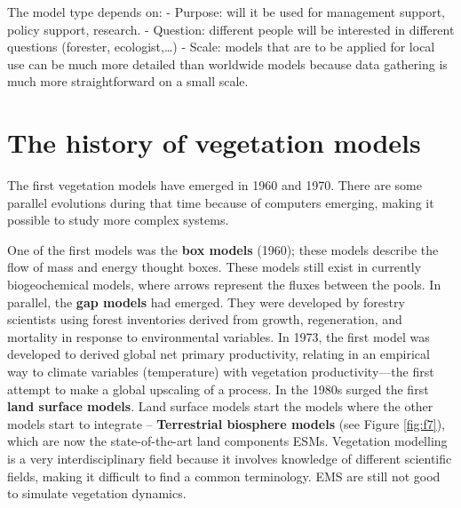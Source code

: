 \documentclass[12pt,oneside]{book}
\begin{document}
The model type depends on: - Purpose: will it be used for management
support, policy support, research. - Question: different people will be
interested in different questions (forester, ecologist,\ldots{}) -
Scale: models that are to be applied for local use can be much more
detailed than worldwide models because data gathering is much more
straightforward on a small scale.

\section{The history of vegetation
models}\label{the-history-of-vegetation-models}

The first vegetation models have emerged in 1960 and 1970. There are
some parallel evolutions during that time because of computers emerging,
making it possible to study more complex systems.

One of the first models was the \textbf{box models} (1960); these models
describe the flow of mass and energy thought boxes. These models still
exist in currently biogeochemical models, where arrows represent the
fluxes between the pools. In parallel, the \textbf{gap models} had
emerged. They were developed by forestry scientists using forest
inventories derived from growth, regeneration, and mortality in response
to environmental variables. In 1973, the first model was developed to
derived global net primary productivity, relating in an empirical way to
climate variables (temperature) with vegetation productivity---the first
attempt to make a global upscaling of a process. In the 1980s surged the
first \textbf{land surface models}. Land surface models start the models
where the other models start to integrate -- \textbf{Terrestrial
biosphere models} (see Figure \ref{fig:f7}), which are now the
state-of-the-art land components ESMs. Vegetation modelling is a very
interdisciplinary field because it involves knowledge of different
scientific fields, making it difficult to find a common terminology. EMS
are still not good to simulate vegetation dynamics.
\end{document}
